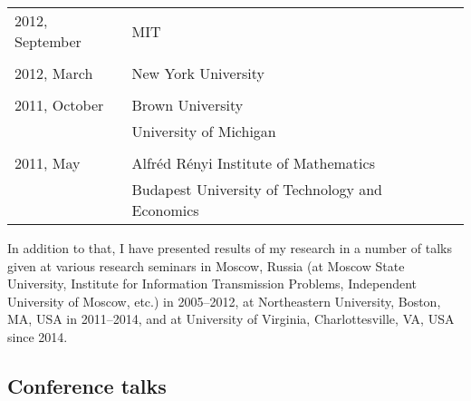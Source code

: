 \documentclass[letterpaper,11pt]{article}
\begin{document}
\begin{longtable}{llc}
  2012, September & MIT \\\\ 

  2012, March & New York University\\\\

  2011, October & Brown University \\
  &University of Michigan
  \\
  \\
  2011, May& Alfr\'ed R\'enyi Institute of Mathematics
  \\
  & Budapest University of Technology and Economics
  \\
\end{longtable}
\bigskip

In addition to that, I have presented results of my research in a number of talks given at various research seminars in Moscow, Russia (at Moscow State University, Institute for Information Transmission Problems, Independent University of Moscow, etc.) in 2005--2012, at Northeastern University, Boston, MA, USA in 2011--2014, and
at University of Virginia, Charlottesville, VA, USA since 2014.


\subsection*{Conference talks}
\end{document}
